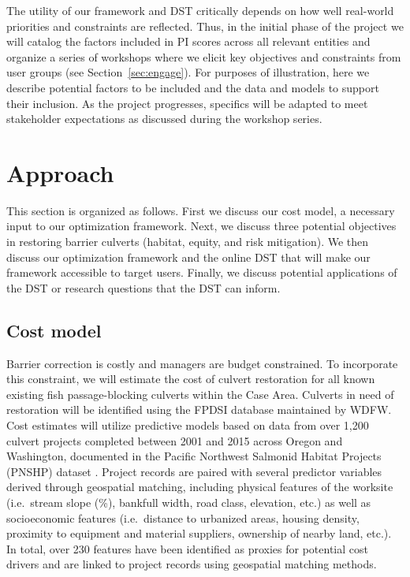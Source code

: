 \documentclass[12pt]{elsarticle}
\begin{document}
The utility of our framework and DST critically depends on how well real-world priorities and constraints are reflected. Thus, in the initial phase of the project we will catalog the factors included in PI scores across all relevant entities and organize a series of workshops where we elicit key objectives and constraints from user groups (see Section~\ref{sec:engage}). For purposes of illustration, here we describe potential factors to be included and the data and models to support their inclusion. As the project progresses, specifics will be adapted to meet stakeholder expectations as discussed during the workshop series.  

%
\section{Approach}

This section is organized as follows. First we discuss our cost model, a necessary input to our optimization framework. Next, we discuss three potential objectives in restoring barrier culverts (habitat, equity, and risk mitigation). We then discuss our optimization framework and the online DST that will make our framework accessible to target users. Finally, we discuss potential applications of the DST or research questions that the DST can inform.

\subsection*{Cost model \label{sec:cost}}

Barrier correction is costly and managers are budget constrained. To incorporate this constraint, we will estimate the cost of culvert restoration for all known existing fish passage-blocking culverts within the Case Area. Culverts in need of restoration will be identified using the FPDSI database maintained by WDFW. Cost estimates will utilize predictive models based on data from over 1,200 culvert projects completed between 2001 and 2015 across Oregon and Washington, documented in the Pacific Northwest Salmonid Habitat Projects (PNSHP) dataset \citep{katz_freshwater_2007, noauthor_pacific_2021}. Project records are paired with several predictor variables derived through geospatial matching, including physical features of the worksite (i.e.\ stream slope (\%), bankfull width, road class, elevation, etc.) as well as socioeconomic features (i.e.\ distance to urbanized areas, housing density, proximity to equipment and material suppliers, ownership of nearby land, etc.). In total, over 230 features have been identified as proxies for potential cost drivers and are linked to project records using geospatial matching methods. 
\end{document}
